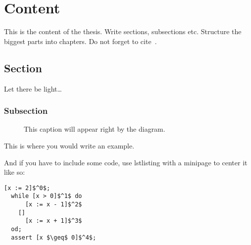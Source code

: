 \documentclass[../thesis.tex]{subfiles}
\begin{document}
\chapter{Content}\label{chap:prelim}
This is the content of the thesis. Write sections, subsections etc. Structure
the biggest parts into chapters. Do not forget to cite~\cite{alanturing}.

\section{Section}\label{sec:mc}
\begin{definition}[Light]
  Let there be light\ldots
\end{definition}

\subsection{Subsection}
\begin{figure}
\centering
{}
\caption[Shorter caption for LoF.]{This caption will appear right by the diagram.}\label{fig:semaphores}
\end{figure}

\begin{example}
  This is where you would write an example.
\end{example}

And if you have to include some code, use lstlisting with a minipage to center
it like so:
\begin{center}
  \begin{minipage}{7cm}
\begin{lstlisting}[caption=GCL program with assertion instead of error location.,label=lst:bmcorig,mathescape=true]
  [x := 2]$^0$;
  while [x > 0]$^1$ do
      [x := x - 1]$^2$
    []
      [x := x + 1]$^3$
  od;
  assert [x $\geq$ 0]$^4$;
\end{lstlisting}
  \end{minipage}
\end{center}

\biblio
\end{document}
